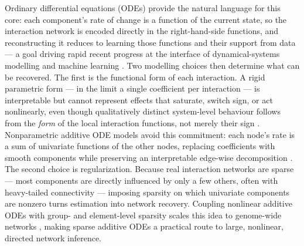 Ordinary differential equations (ODEs) provide the natural language for this core: each
component's rate of change is a function of the current state, so the interaction
network is encoded directly in the right-hand-side functions, and reconstructing it
reduces to learning those functions and their support from data --- a goal driving rapid
recent progress at the interface of dynamical-systems modelling and machine learning
\citep{karniadakis2021physics,gao2022autonomous}. Two modelling choices then determine
what can be recovered. The first is the functional form of each interaction. A rigid
parametric form --- in the limit a single coefficient per interaction --- is
interpretable but cannot represent effects that saturate, switch sign, or act
nonlinearly, even though qualitatively distinct system-level behaviour follows from the
\emph{form} of the local interaction functions, not merely their sign
\citep{barzel2013universality}. Nonparametric additive ODE models avoid this commitment:
each node's rate is a sum of univariate functions of the other nodes, replacing
coefficients with smooth components while preserving an interpretable edge-wise
decomposition \citep{henderson2014network,wu2014saode,chen2017network}. The second choice is
regularization. Because real interaction networks are sparse --- most components are
directly influenced by only a few others, often with heavy-tailed connectivity
\citep{barabasi1999emergence} --- imposing sparsity on which univariate components are
nonzero turns estimation into network recovery. Coupling nonlinear additive ODEs with
group- and element-level sparsity scales this idea to genome-wide networks
\citep{dong2026multitask}, making sparse additive ODEs a practical route to large,
nonlinear, directed network inference.

